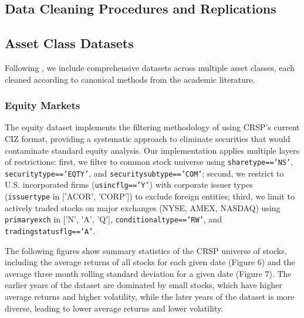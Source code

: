 \documentclass{article}
\begin{document}
\begin{appendices}

\section{Data Cleaning Procedures and Replications}
\label{app:data_cleaning_and_replications}

\subsection{Asset Class Datasets}
\label{sec:asset_classes}


Following \cite{He2017}, we include comprehensive datasets across multiple asset classes, each cleaned according to canonical methods from the academic literature.

\subsubsection{Equity Markets}
\label{sec:equity}

The equity dataset implements the filtering methodology of \cite{Fama1993} using CRSP's current CIZ format, providing a systematic approach to eliminate securities that would contaminate standard equity analysis. Our implementation applies multiple layers of restrictions: first, we filter to common stock universe using \texttt{sharetype=='NS'}, \texttt{securitytype=='EQTY'}, and \texttt{securitysubtype=='COM'}; second, we restrict to U.S. incorporated firms (\texttt{usincflg=='Y'}) with corporate issuer types (\texttt{issuertype} in ['ACOR', 'CORP']) to exclude foreign entities; third, we limit to actively traded stocks on major exchanges (NYSE, AMEX, NASDAQ) using \texttt{primaryexch} in ['N', 'A', 'Q'], \texttt{conditionaltype=='RW'}, and \texttt{tradingstatusflg=='A'}. 

The following figures show summary statistics of the CRSP universe of stocks, 
including the average returns of all stocks for each given date (Figure 6) 
and the average three month rolling standard deviation for a given date (Figure 7).
The earlier years of the dataset are dominated by small stocks, 
which have higher average returns and higher volatility, while the later years of 
the dataset is more diverse, leading to lower average returns and lower volatility.


\end{appendices}
\end{document}
